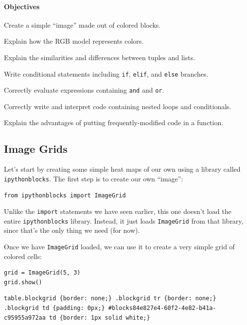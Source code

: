 \documentclass{book}
\begin{document}
\mbox{}\paragraph{Objectives}

\begin{swcitemize}
\item
  Create a simple ``image'' made out of colored blocks.
\item
  Explain how the RGB model represents colors.
\item
  Explain the similarities and differences between tuples and lists.
\item
  Write conditional statements including \texttt{if}, \texttt{elif}, and
  \texttt{else} branches.
\item
  Correctly evaluate expressions containing \texttt{and} and
  \texttt{or}.
\item
  Correctly write and interpret code containing nested loops and
  conditionals.
\item
  Explain the advantages of putting frequently-modified code in a
  function.
\end{swcitemize}

\subsection{Image Grids}

Let's start by creating some simple heat maps of our own using a library
called \texttt{ipythonblocks}. The first step is to create our own
``image'':

\begin{verbatim}
from ipythonblocks import ImageGrid
\end{verbatim}

Unlike the \texttt{import} statements we have seen earlier, this one
doesn't load the entire \texttt{ipythonblocks} library. Instead, it just
loads \texttt{ImageGrid} from that library, since that's the only thing
we need (for now).

Once we have \texttt{ImageGrid} loaded, we can use it to create a very
simple grid of colored cells:

\begin{verbatim}
grid = ImageGrid(5, 3)
grid.show()
\end{verbatim}

\begin{verbatim}
table.blockgrid {border: none;} .blockgrid tr {border: none;} .blockgrid td {padding: 0px;} #blocks84e827e4-60f2-4e82-b41a-c95955a972aa td {border: 1px solid white;}
\end{verbatim}
\end{document}
